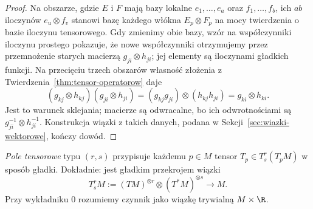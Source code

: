 \begin{proof}
Na obszarze, gdzie $E$ i $F$ mają bazy lokalne
$e_1,\ldots,e_a$ oraz $f_1,\ldots,f_b$, ich $ab$
iloczynów $e_u\otimes f_v$ stanowi bazę każdego włókna
$E_p\otimes F_p$ na mocy twierdzenia o bazie iloczynu
tensorowego. Gdy zmienimy obie bazy, wzór na współczynniki
iloczynu prostego pokazuje, że nowe współczynniki otrzymujemy
przez przemnożenie starych macierzą $g_{ji}\otimes h_{ji}$;
jej elementy są iloczynami gładkich funkcji. Na przecięciu
trzech obszarów własność złożenia z
Twierdzenia~\ref{thm:tensor-operatorow} daje
\[
 (g_{kj}\otimes h_{kj})(g_{ji}\otimes h_{ji})
   =(g_{kj}g_{ji})\otimes(h_{kj}h_{ji})
   =g_{ki}\otimes h_{ki}.
\]
Jest to warunek sklejania; macierze są odwracalne,
bo ich odwrotnościami są $g_{ji}^{-1}\otimes h_{ji}^{-1}$.
Konstrukcja wiązki z takich danych, podana w
Sekcji~\ref{sec:wiazki-wektorowe}, kończy dowód.
\end{proof}

\begin{definicja}
\label{def:pole-tensorowe}
\emph{Pole tensorowe} typu $(r,s)$ przypisuje każdemu
$p\in M$ tensor $T_p\in T^r_s(T_pM)$ w sposób gładki.
Dokładnie: jest gładkim przekrojem wiązki
\begin{equation}\label{eq:wiazka-tensorowa}
 T^r_s M:=(TM)^{\otimes r}\otimes(T^*M)^{\otimes s}
 \longrightarrow M.
\end{equation}
Przy wykładniku $0$ rozumiemy czynnik jako wiązkę
trywialną $M\times\R$.
\end{definicja}

